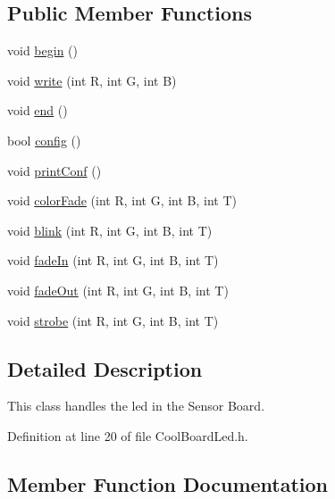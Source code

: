\subsection*{Public Member Functions}
\begin{DoxyCompactItemize}
\item 
void \hyperlink{class_cool_board_led_ae3cbde8affcc6f011cbd698c8ef911f6}{begin} ()
\item 
void \hyperlink{class_cool_board_led_a30fadd4cbec17ceea428bf7a32207e87}{write} (int R, int G, int B)
\item 
void \hyperlink{class_cool_board_led_a69f323359e0c9f797422f2152b5d41ef}{end} ()
\item 
bool \hyperlink{class_cool_board_led_a1b60e5e30bea96c49ed62ed1bf1ffc8b}{config} ()
\item 
void \hyperlink{class_cool_board_led_a8ed3053a36f0ed4a131f43b5b17efb61}{print\+Conf} ()
\item 
void \hyperlink{class_cool_board_led_a6dbfe23988f43e1242cd05e69b13ff30}{color\+Fade} (int R, int G, int B, int T)
\item 
void \hyperlink{class_cool_board_led_a27706bc029f6a126c55d0b91624ad7fa}{blink} (int R, int G, int B, int T)
\item 
void \hyperlink{class_cool_board_led_aec915442a8441c7cd45c3279d3ff8821}{fade\+In} (int R, int G, int B, int T)
\item 
void \hyperlink{class_cool_board_led_a27c4e14fa2cd3639c0844152cea98887}{fade\+Out} (int R, int G, int B, int T)
\item 
void \hyperlink{class_cool_board_led_adc08c0ac07473499971c503d300f0413}{strobe} (int R, int G, int B, int T)
\end{DoxyCompactItemize}


\subsection{Detailed Description}
This class handles the led in the Sensor Board. 

Definition at line 20 of file Cool\+Board\+Led.\+h.



\subsection{Member Function Documentation}
\mbox{\label{class_cool_board_led_ae3cbde8affcc6f011cbd698c8ef911f6}} 
